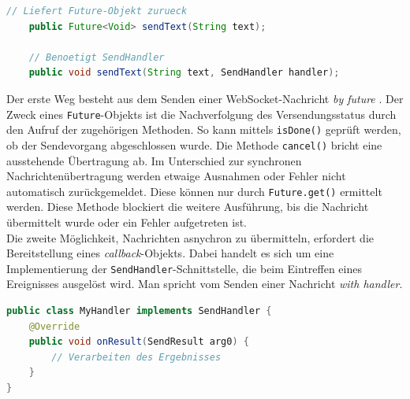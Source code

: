 \documentclass[11pt,a4paper,titlepage]{scrartcl}
\numberwithin{equation}{section}
\begin{document}
\begin{lstlisting}[frame=single, language=Java, caption=Java: Future und Handler]
	// Liefert Future-Objekt zurueck
	public Future<Void> sendText(String text);
	
	// Benoetigt SendHandler
	public void sendText(String text, SendHandler handler);

\end{lstlisting}

\noindent Der erste Weg besteht aus dem Senden einer WebSocket-Nachricht \textit{by future} \autocite[119]{coward_java_2014}. Der Zweck eines \texttt{Future}-Objekts ist die Nachverfolgung des Versendungsstatus durch den Aufruf der zugehörigen Methoden. So kann mittels \texttt{isDone()} geprüft werden, ob der Sendevorgang abgeschlossen wurde. Die Methode \texttt{cancel()} bricht eine ausstehende Übertragung ab. Im Unterschied zur synchronen Nachrichtenübertragung werden etwaige Ausnahmen oder Fehler nicht automatisch zurückgemeldet. Diese können nur durch 
\texttt{Future.get()} ermittelt werden. Diese Methode blockiert die weitere Ausführung, bis die Nachricht übermittelt wurde oder ein Fehler aufgetreten ist. \\

\noindent Die zweite Möglichkeit, Nachrichten asnychron zu übermitteln, erfordert die Bereitstellung eines \textit{callback}-Objekts. Dabei handelt es sich um eine Implementierung der \texttt{SendHandler}-Schnittstelle, die beim Eintreffen eines Ereignisses ausgelöst wird. Man spricht vom Senden einer Nachricht \textit{with handler}.\smallskip

\begin{lstlisting}[frame=single, language=Java, caption=Java: Callback-Interface SendHandler]
public class MyHandler implements SendHandler {
	@Override
	public void onResult(SendResult arg0) {
		// Verarbeiten des Ergebnisses
	}
}
\end{lstlisting}
\end{document}

